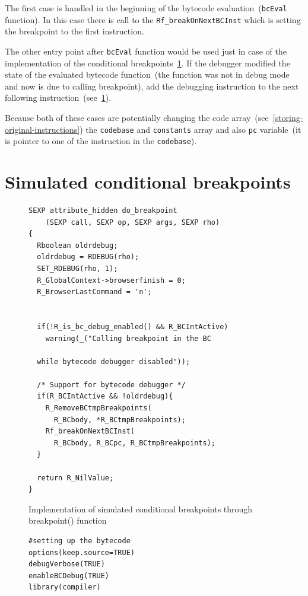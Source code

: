 \documentclass[thesis=M,english]{FITthesis}[2018/10/20]
\newcommand{\code}[1]{\texttt{#1}}
\begin{document}
{The first case is handled in the beginning of the bytecode evaluation~(\code{bcEval} function). In this case there is call to the \code{Rf{\_}breakOnNextBCInst} which is setting the breakpoint to the first instruction. 

The other entry point after \code{bcEval} function would be used just in case of the implementation of the conditional breakpoints~\ref{conditional-breakpoints}. If the debugger modified the state of the evaluated bytecode function~(the function was not in debug mode and now is due to calling breakpoint), add the debugging instruction to the next following instruction~(see~\ref{conditional-breakpoints}).

Because both of these cases are potentially changing the code array~(see~\ref{storing-original-instructions}) the \code{codebase} and \code{constants} array and also \code{pc} variable~(it is pointer to one of the instruction in the \code{codebase}).

\section{Simulated conditional breakpoints}\label{conditional-breakpoints}

\begin{figure}[h]
\begin{lstlisting}
SEXP attribute_hidden do_breakpoint
	(SEXP call, SEXP op, SEXP args, SEXP rho)
{
  Rboolean oldrdebug;
  oldrdebug = RDEBUG(rho);
  SET_RDEBUG(rho, 1);
  R_GlobalContext->browserfinish = 0;
  R_BrowserLastCommand = 'n';


  if(!R_is_bc_debug_enabled() && R_BCIntActive)
    warning(_("Calling breakpoint in the BC 
  
  while bytecode debugger disabled"));

  /* Support for bytecode debugger */
  if(R_BCIntActive && !oldrdebug){
    R_RemoveBCtmpBreakpoints(
      R_BCbody, *R_BCtmpBreakpoints);
    Rf_breakOnNextBCInst(
      R_BCbody, R_BCpc, R_BCtmpBreakpoints);
  }

  return R_NilValue;
}
\end{lstlisting}
	\caption{Implementation of simulated conditional breakpoints through breakpoint() function}\label{fig:conditional-breakpoints-breakpoint}
\end{figure}

\begin{figure}[h]
\begin{lstlisting}
#setting up the bytecode
options(keep.source=TRUE)
debugVerbose(TRUE)
enableBCDebug(TRUE)
library(compiler)


\end{lstlisting}
\end{figure}}
\end{document}
